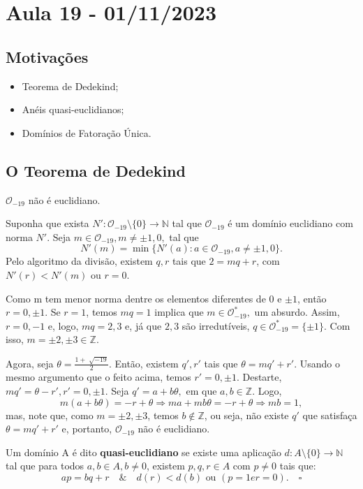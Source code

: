 \documentclass[algebraII_notes.tex]{subfiles}
\begin{document}
\section{Aula 19 - 01/11/2023}
\subsection{Motivações}
\begin{itemize}
	\item Teorema de Dedekind;
	\item Anéis quasi-euclidianos;
	\item Domínios de Fatoração Única.
\end{itemize}
\subsection{O Teorema de Dedekind}
\begin{theorem*}
	\(\mathcal{O}_{-19}\) não é euclidiano.
\end{theorem*}
\begin{proof*}
	Suponha que exista \(N':\mathcal{O}_{-19}\setminus{\{0\}}\rightarrow \mathbb{N}\) tal que \(\mathcal{O}_{-19}\) é um domínio euclidiano com norma \(N'.\) Seja \(m\in \mathcal{O}_{-19}, m\neq \pm1, 0,\)
	tal que
	\[
		N'(m) = \min\{N'(a): a\in \mathcal{O}_{-19}, a\neq \pm1, 0\}.
	\]
	Pelo algoritmo da divisão, existem \(q, r\) tais que \(2 = mq + r\), com \(N'(r) < N'(m)\)
	ou \(r=0\).

	Como m tem menor norma dentre os elementos diferentes de \(0\) e \(\pm 1\), então \(r=0, \pm1\). Se \(r=1\), temos
	\(mq = 1\) implica que \(m\in \mathcal{O}_{-19}^{*},\) um absurdo. Assim, \(r=0, -1\) e,
	logo, \(mq = 2, 3\) e, já que \(2, 3\) são irredutíveis, \(q\in \mathcal{O}_{-19}^{*} = \{\pm1\}.\) Com isso,
	\(m=\pm2, \pm 3\in \mathbb{Z}.\)

	Agora, seja \(\theta = \frac{1 + \sqrt[]{-19}}{2}.\) Então, existem \(q', r'\) tais que \(\theta  = mq'+r'.\) Usando o mesmo
	argumento que o feito acima, temos \(r'=0, \pm1.\) Destarte, \(mq'=\theta - r', r'=0, \pm1.\) Seja \(q'= a + b\theta ,\)
	em que \(a, b\in \mathbb{Z}.\) Logo,
	\[
		m(a + b\theta ) = -r + \theta  \Rightarrow ma + mb\theta = -r + \theta  \Rightarrow mb = 1,
	\]
	mas, note que, como \(m = \pm2, \pm3\), temos \(b\not\in \mathbb{Z}\), ou seja, não existe \(q'\) que satisfaça \(\theta  = mq' + r'\) e, portanto,
	\(\mathcal{O}_{-19}\) não é euclidiano. \qedsymbol
\end{proof*}
\begin{def*}
	Um domínio A é dito \textbf{quasi-euclidiano} se existe uma aplicação \(d:A\setminus{\{0\}}\rightarrow \mathbb{N}\) tal que para todos \(a, b\in A, b\neq0\),
	existem \(p, q, r\in A\) com \(p\neq0\) tais que:
	\[
		ap = bq + r\quad\&\quad d(r) < d(b) \text{ ou } (p=1 e r=0).\quad\square
	\]
\end{def*}
\end{document}
